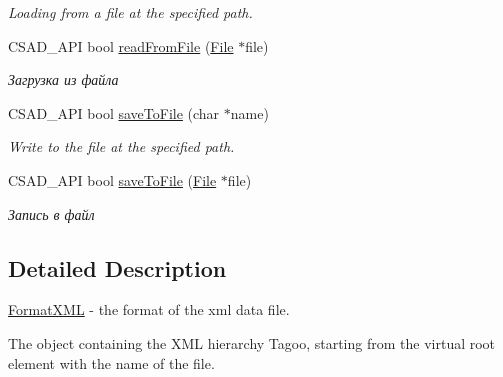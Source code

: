 \begin{DoxyCompactItemize}
\begin{DoxyCompactList}\small\item\em Loading from a file at the specified path. \end{DoxyCompactList}\item 
\hypertarget{classcsad_1_1_format_x_m_l_ab02214b17baf6d4dcdd2a4621dd9cf29}{C\-S\-A\-D\-\_\-\-A\-P\-I bool \hyperlink{classcsad_1_1_format_x_m_l_ab02214b17baf6d4dcdd2a4621dd9cf29}{read\-From\-File} (\hyperlink{classcsad_1_1_file}{File} $\ast$file)}\label{classcsad_1_1_format_x_m_l_ab02214b17baf6d4dcdd2a4621dd9cf29}

\begin{DoxyCompactList}\small\item\em Загрузка из файла \end{DoxyCompactList}\item 
\hypertarget{classcsad_1_1_format_x_m_l_a8da41425b3b61fe1b68b3455fc0a6b8f}{C\-S\-A\-D\-\_\-\-A\-P\-I bool \hyperlink{classcsad_1_1_format_x_m_l_a8da41425b3b61fe1b68b3455fc0a6b8f}{save\-To\-File} (char $\ast$name)}\label{classcsad_1_1_format_x_m_l_a8da41425b3b61fe1b68b3455fc0a6b8f}

\begin{DoxyCompactList}\small\item\em Write to the file at the specified path. \end{DoxyCompactList}\item 
\hypertarget{classcsad_1_1_format_x_m_l_a978030ec8cb813ef6f9505febbc3596d}{C\-S\-A\-D\-\_\-\-A\-P\-I bool \hyperlink{classcsad_1_1_format_x_m_l_a978030ec8cb813ef6f9505febbc3596d}{save\-To\-File} (\hyperlink{classcsad_1_1_file}{File} $\ast$file)}\label{classcsad_1_1_format_x_m_l_a978030ec8cb813ef6f9505febbc3596d}

\begin{DoxyCompactList}\small\item\em Запись в файл \end{DoxyCompactList}\end{DoxyCompactItemize}


\subsection{Detailed Description}
\hyperlink{classcsad_1_1_format_x_m_l}{Format\-X\-M\-L} -\/ the format of the xml data file. 

The object containing the X\-M\-L hierarchy Tagoo, starting from the virtual root element with the name of the file.

